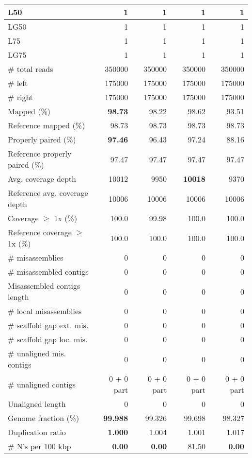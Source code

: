 \documentclass[12pt,a4paper]{article}
\begin{document}
\begin{table}[ht]
\begin{center}
\begin{tabular}{|l*{4}{|r}|}
L50 & 1 & 1 & 1 & 1 \\ \hline
LG50 & 1 & 1 & 1 & 1 \\ \hline
L75 & 1 & 1 & 1 & 1 \\ \hline
LG75 & 1 & 1 & 1 & 1 \\ \hline
\# total reads & 350000 & 350000 & 350000 & 350000 \\ \hline
\# left & 175000 & 175000 & 175000 & 175000 \\ \hline
\# right & 175000 & 175000 & 175000 & 175000 \\ \hline
Mapped (\%) & {\bf 98.73} & 98.22 & 98.62 & 93.51 \\ \hline
Reference mapped (\%) & 98.73 & 98.73 & 98.73 & 98.73 \\ \hline
Properly paired (\%) & {\bf 97.46} & 96.43 & 97.24 & 88.16 \\ \hline
Reference properly paired (\%) & 97.47 & 97.47 & 97.47 & 97.47 \\ \hline
Avg. coverage depth & 10012 & 9950 & {\bf 10018} & 9370 \\ \hline
Reference avg. coverage depth & 10006 & 10006 & 10006 & 10006 \\ \hline
Coverage $\geq$ 1x (\%) & 100.0 & 99.98 & 100.0 & 100.0 \\ \hline
Reference coverage $\geq$ 1x (\%) & 100.0 & 100.0 & 100.0 & 100.0 \\ \hline
\# misassemblies & 0 & 0 & 0 & 0 \\ \hline
\# misassembled contigs & 0 & 0 & 0 & 0 \\ \hline
Misassembled contigs length & 0 & 0 & 0 & 0 \\ \hline
\# local misassemblies & 0 & 0 & 0 & 0 \\ \hline
\# scaffold gap ext. mis. & 0 & 0 & 0 & 0 \\ \hline
\# scaffold gap loc. mis. & 0 & 0 & 0 & 0 \\ \hline
\# unaligned mis. contigs & 0 & 0 & 0 & 0 \\ \hline
\# unaligned contigs & 0 + 0 part & 0 + 0 part & 0 + 0 part & 0 + 0 part \\ \hline
Unaligned length & 0 & 0 & 0 & 0 \\ \hline
Genome fraction (\%) & {\bf 99.988} & 99.326 & 99.698 & 98.327 \\ \hline
Duplication ratio & {\bf 1.000} & 1.004 & 1.001 & 1.017 \\ \hline
\# N's per 100 kbp & {\bf 0.00} & {\bf 0.00} & 81.50 & {\bf 0.00} \\ \hline

\end{tabular}
\end{center}
\end{table}
\end{document}
